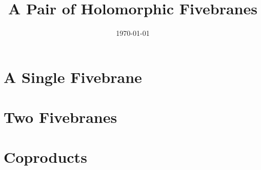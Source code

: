 \documentclass{amsart}
\begin{document}
\title{A Pair of Holomorphic Fivebranes}


\date{\today}
\maketitle


\section{A Single Fivebrane}



\section{Two Fivebranes}




\section{Coproducts}
\end{document}
